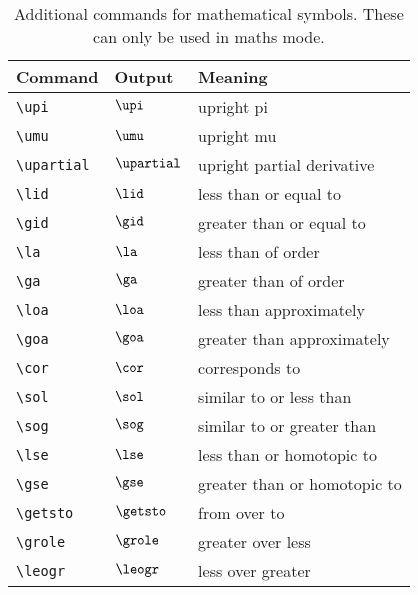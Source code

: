 \begin{table}
 \caption{Additional commands for mathematical symbols. These can only be used in maths mode.}
 \label{tab:mathssymbols}
 \begin{tabular}{lll}
  \hline
  Command & Output & Meaning\\
  \hline
  \verb'\upi' & $\upi$ & upright pi\\[2pt] %
  \verb'\umu' & $\umu$ & upright mu\\[2pt]
  \verb'\upartial' & $\upartial$ & upright partial derivative\\[2pt]
  \verb'\lid' & $\lid$ & less than or equal to\\[2pt]
  \verb'\gid' & $\gid$ & greater than or equal to\\[2pt]
  \verb'\la' & $\la$ & less than of order\\[2pt]
  \verb'\ga' & $\ga$ & greater than of order\\[2pt]
  \verb'\loa' & $\loa$ & less than approximately\\[2pt]
  \verb'\goa' & $\goa$ & greater than approximately\\[2pt]
  \verb'\cor' & $\cor$ & corresponds to\\[2pt]
  \verb'\sol' & $\sol$ & similar to or less than\\[2pt]
  \verb'\sog' & $\sog$ & similar to or greater than\\[2pt]
  \verb'\lse' & $\lse$ & less than or homotopic to \\[2pt]
  \verb'\gse' & $\gse$ & greater than or homotopic to\\[2pt]
  \verb'\getsto' & $\getsto$ & from over to\\[2pt]
  \verb'\grole' & $\grole$ & greater over less\\[2pt]
  \verb'\leogr' & $\leogr$ & less over greater\\
  \hline
 \end{tabular}
\end{table}
